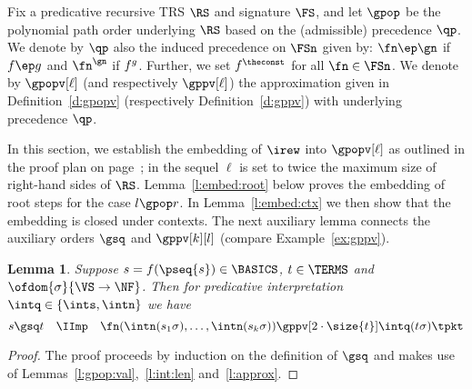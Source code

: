 \documentclass{LMCS}
\newtheorem{lemma}[thm]{Lemma}
\begin{document}
Fix a predicative recursive TRS $\RS$ and signature $\FS$, 
and let $\gpop$ be the polynomial path order underlying $\RS$ 
based on the (admissible) precedence $\qp$.
We denote by $\qp$ also the induced precedence on $\FSn$ 
given by: $\fn \ep \gn$ if $f \ep g$ and $\fn \sp \gn$ if $f \sp g$.
Further, we set $f \sp \theconst$ for all $\fn \in \FSn$.
We denote by $\gpopv[\ell]$ (and respectively $\gppv[\ell]$) the approximation 
given in Definition~\ref{d:gpopv} (respectively Definition~\ref{d:gppv}) with underlying precedence $\qp$.

In this section, we establish the embedding of $\irew$ into $\gpopv[\ell]$ as
outlined in the proof plan on page~\pageref{popstar:proofplan}; in the sequel
$\ell$ is set to twice the maximum size of right-hand sides of $\RS$.
Lemma~\ref{l:embed:root} below proves the embedding of root steps 
for the case $l \gpop r$. In Lemma~\ref{l:embed:ctx} we then show that the embedding is closed under contexts.
The next auxiliary lemma connects the auxiliary orders $\gsq$ and $\gppv[k][l]$ (compare Example~\ref{ex:gppv}).

\begin{lemma}\label{l:embedgsq:root}
  Suppose $s = f(\pseq{s}) \in \BASICS$, $t \in \TERMS$ and $\ofdom{\sigma}{\VS \to \NF}$. 
  Then for predicative interpretation $\intq \in \{\ints, \intn\}$
  we have 
  $$
   s \gsq t \quad \IImp \quad \fn(\intn(s_1\sigma), \dots, \intn(s_k\sigma)) \gppv[2\cdot\size{t}] \intq(t\sigma) \tpkt
  $$
\end{lemma}
\begin{proof}
The proof proceeds by induction on the definition of $\gsq$ and makes
use of Lemmas~\ref{l:gpop:val},~\ref{l:int:len} and~\ref{l:approx}.
\end{proof}
\end{document}
